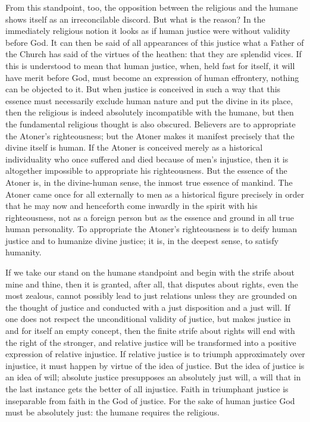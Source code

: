 \documentclass[12pt,a4paper,openany]{book}
\newcommand{\opage}[1]{\marginnote{\footnotesize\textit{[#1]}}}
\begin{document}
From this standpoint, too, the opposition between the religious and the
humane shows itself as an irreconcilable discord. But what is the reason?
In the immediately religious notion it looks as if human justice were
without validity before God. It can then be said of all appearances of
this justice what a Father of the Church has said of the virtues of the
heathen: that they are splendid vices. If this is understood to mean that
human justice, when, held fast for itself, it will have merit before God,
must become an expression of human effrontery, nothing can be objected to
it. But when justice is conceived in such a way that this essence must
necessarily exclude human nature and put the divine in its place, then
the religious is indeed absolutely incompatible with the humane, but
then the fundamental religious thought is also obscured. Believers are to
appropriate the Atoner's righteousness; but the Atoner makes it manifest
precisely that \opage{106}the divine itself is human. If the Atoner is conceived
merely as a historical individuality who once suffered and died because
of men's injustice, then it is altogether impossible to appropriate his
righteousness. But the essence of the Atoner is, in the divine-human
sense, the inmost true essence of mankind. The Atoner came once for all
externally to men as a historical figure precisely in order that he may
now and henceforth come inwardly in the spirit with his righteousness,
not as a foreign person but as the essence and ground in all true human
personality. To appropriate the Atoner's righteousness is to deify human
justice and to humanize divine justice; it is, in the deepest sense, to
satisfy humanity.

If we take our stand on the humane standpoint and begin with the strife
about mine and thine, then it is granted, after all, that disputes about
rights, even the most zealous, cannot possibly lead to just relations
unless they are grounded on the thought of justice and conducted with a
just disposition and a just will. If one does not respect the
unconditional validity of justice, but makes justice in and for itself an
empty concept, then the finite strife about rights will end with the
right of the stronger, and relative justice will be transformed into a
positive expression of relative injustice. If relative justice is to
triumph approximately over injustice, it must happen by virtue of the
idea of justice. But the idea of justice is an idea of will; absolute
justice presupposes an absolutely just will, a will that in the last
instance gets the better of all injustice. Faith in triumphant justice is
inseparable from faith in the God of justice. \opage{107}For the sake of human
justice God must be absolutely just: the humane requires the religious.
\end{document}
